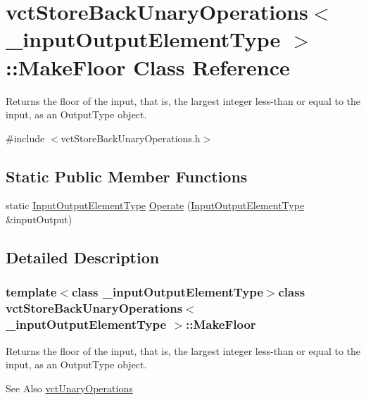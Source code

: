 \hypertarget{classvct_store_back_unary_operations_1_1_make_floor}{\section{vct\-Store\-Back\-Unary\-Operations$<$ \-\_\-input\-Output\-Element\-Type $>$\-:\-:Make\-Floor Class Reference}
\label{classvct_store_back_unary_operations_1_1_make_floor}
}


Returns the floor of the input, that is, the largest integer less-\/than or equal to the input, as an Output\-Type object.  




{\ttfamily \#include $<$vct\-Store\-Back\-Unary\-Operations.\-h$>$}

\subsection*{Static Public Member Functions}
\begin{DoxyCompactItemize}
\item 
static \hyperlink{classvct_store_back_unary_operations_a8af17faaa73a8d090094d468eee32062}{Input\-Output\-Element\-Type} \hyperlink{classvct_store_back_unary_operations_1_1_make_floor_a8d544c65a3ed94a5707d953451d88dcc}{Operate} (\hyperlink{classvct_store_back_unary_operations_a8af17faaa73a8d090094d468eee32062}{Input\-Output\-Element\-Type} \&input\-Output)
\end{DoxyCompactItemize}


\subsection{Detailed Description}
\subsubsection*{template$<$class \-\_\-input\-Output\-Element\-Type$>$class vct\-Store\-Back\-Unary\-Operations$<$ \-\_\-input\-Output\-Element\-Type $>$\-::\-Make\-Floor}

Returns the floor of the input, that is, the largest integer less-\/than or equal to the input, as an Output\-Type object. 

\begin{DoxySeeAlso}{See Also}
\hyperlink{classvct_unary_operations}{vct\-Unary\-Operations} 
\end{DoxySeeAlso}


